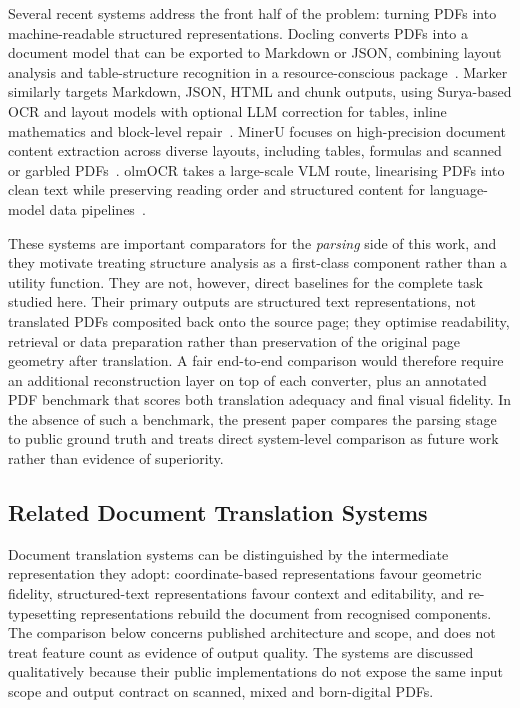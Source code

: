 Several recent systems address the front half of the problem: turning PDFs into
machine-readable structured representations. Docling converts PDFs into a
document model that can be exported to Markdown or JSON, combining layout
analysis and table-structure recognition in a resource-conscious
package~\citep{docling}. Marker similarly targets Markdown, JSON, HTML and chunk
outputs, using Surya-based OCR and layout models with optional LLM correction for
tables, inline mathematics and block-level repair~\citep{marker}. MinerU focuses
on high-precision document content extraction across diverse layouts, including
tables, formulas and scanned or garbled PDFs~\citep{mineru}. olmOCR takes a
large-scale VLM route, linearising PDFs into clean text while preserving reading
order and structured content for language-model data pipelines~\citep{olmocr}.

These systems are important comparators for the \emph{parsing} side of this
work, and they motivate treating structure analysis as a first-class component
rather than a utility function. They are not, however, direct baselines for the
complete task studied here. Their primary outputs are structured text
representations, not translated PDFs composited back onto the source page; they
optimise readability, retrieval or data preparation rather than preservation of
the original page geometry after translation. A fair end-to-end comparison would
therefore require an additional reconstruction layer on top of each converter,
plus an annotated PDF benchmark that scores both translation adequacy and final
visual fidelity. In the absence of such a benchmark, the present paper compares
the parsing stage to public ground truth and treats direct system-level
comparison as future work rather than evidence of superiority.

\subsection{Related Document Translation Systems}
\label{subsec:lit-systems}

Document translation systems can be distinguished by the intermediate
representation they adopt: coordinate-based representations favour geometric
fidelity, structured-text representations favour context and editability, and
re-typesetting representations rebuild the document from recognised components.
The comparison below concerns published architecture and scope, and does not
treat feature count as evidence of output quality. The systems are discussed
qualitatively because their public implementations do not expose the same input
scope and output contract on scanned, mixed and born-digital PDFs.

